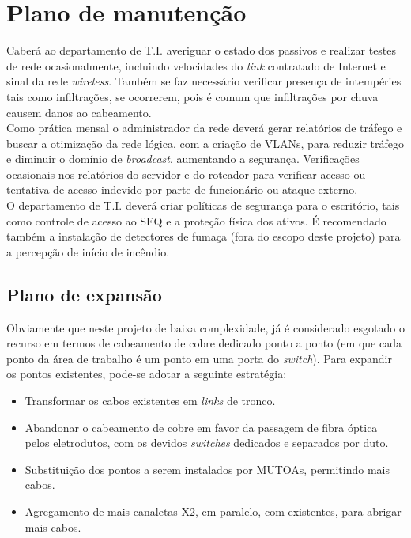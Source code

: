 \documentclass[	DIV=calc,%
							paper=a4,%
							fontsize=12pt,%
							onecolumn]{scrartcl}	 					%
\begin{document}
\section{Plano de manutenção}

Caberá ao departamento de T.I. averiguar o estado dos passivos e realizar testes de rede ocasionalmente, incluindo velocidades do \textit{link} contratado de Internet e sinal da rede \textit{wireless}. Também se faz necessário verificar presença de intempéries tais como infiltrações, se ocorrerem, pois é comum que infiltrações por chuva causem danos ao cabeamento. 
\\

Como prática mensal o administrador da rede deverá gerar relatórios de tráfego e buscar a otimização da rede lógica, com a criação de VLANs, para reduzir tráfego e diminuir o domínio de \textit{broadcast}, aumentando a segurança. Verificações ocasionais nos relatórios do servidor e do roteador para verificar acesso ou tentativa de acesso indevido por parte de funcionário ou ataque externo.
\\

O departamento de T.I. deverá criar políticas de segurança para o escritório, tais como controle de acesso ao SEQ e a proteção física dos ativos. É recomendado também a instalação de detectores de fumaça (fora do escopo deste projeto) para a percepção de início de incêndio.

\subsection{Plano de expansão}

Obviamente que neste projeto de baixa complexidade, já é considerado esgotado o recurso em termos de cabeamento de cobre dedicado ponto a ponto (em que cada ponto da área de trabalho é um ponto em uma porta do \textit{switch}). Para expandir os pontos existentes, pode-se adotar a seguinte estratégia:
\\

\begin{itemize}
	\item Transformar os cabos existentes em \textit{links} de tronco.
	\\
	\item Abandonar o cabeamento de cobre em favor da passagem de fibra óptica pelos eletrodutos, com os devidos \textit{switches} dedicados e separados por duto.
	\\
	\item Substituição dos pontos a serem instalados por MUTOAs, permitindo mais cabos.
	\\
	\item Agregamento de mais canaletas X2, em paralelo, com existentes, para abrigar mais cabos.
\end{itemize}
\end{document}
